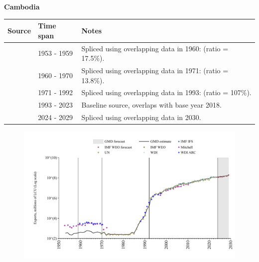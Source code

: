 \documentclass[12pt,a4paper,landscape]{article}
\begin{document}
\begin{adjustbox}{max totalsize={\paperwidth}{\paperheight},center}
\begin{minipage}[t][\textheight][t]{\textwidth}
\vspace*{0.5cm}
{}
\begin{center}
{\Large\bfseries Cambodia}
\end{center}
\vspace{0.5cm}
\begin{table}[H]
\centering
\small
\begin{tabular}{|l|l|l|}
\hline
\textbf{Source} & \textbf{Time span} & \textbf{Notes} \\
\hline
\rowcolor{white}\cite{Mitchell}& 1953 - 1959 &Spliced using overlapping data in 1960: (ratio = 17.5\%).\\
\rowcolor{lightgray}\cite{WDI}& 1960 - 1970 &Spliced using overlapping data in 1971: (ratio = 13.8\%).\\
\rowcolor{white}\cite{UN}& 1971 - 1992 &Spliced using overlapping data in 1993: (ratio = 107\%).\\
\rowcolor{lightgray}\cite{WDI}& 1993 - 2023 &Baseline source, overlaps with base year 2018.\\
\rowcolor{white}\cite{IMF_WEO_forecast}& 2024 - 2029 &Spliced using overlapping data in 2030.\\
\hline
\end{tabular}
\end{table}
\begin{figure}[H]
\centering
\includegraphics[width=\textwidth,height=0.6\textheight,keepaspectratio]{graphs/KHM_exports.pdf}
\end{figure}
\end{minipage}
\end{adjustbox}
\end{document}
